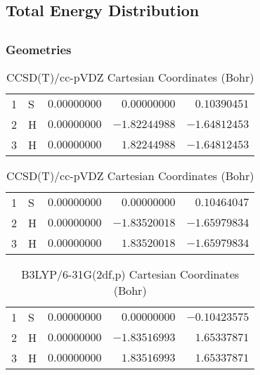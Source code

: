 \documentclass[10pt,oneside]{article}
\begin{document}
\begin{table}
\subsection*{Total Energy Distribution}
\centering\end{table}

\clearpage

\subsection{}

\begin{table}[h!]
\subsubsection*{Geometries}
\begin{multicols}{2}
\centering
\caption{CCSD(T)/cc-pVTZ Cartesian Coordinates (Bohr)}
\begin{tabular}{llrrr}
\toprule
1  & S  & $ 0.00000000$ & $ 0.00000000$ & $ 0.10390451$ \\
2  & H  & $ 0.00000000$ & $-1.82244988$ & $-1.64812453$ \\
3  & H  & $ 0.00000000$ & $ 1.82244988$ & $-1.64812453$ \\
\bottomrule
\end{tabular}
\caption{CCSD(T)/cc-pVDZ Cartesian Coordinates (Bohr)}
\begin{tabular}{llrrr}
\toprule
1  & S  & $ 0.00000000$ & $ 0.00000000$ & $ 0.10464047$ \\
2  & H  & $ 0.00000000$ & $-1.83520018$ & $-1.65979834$ \\
3  & H  & $ 0.00000000$ & $ 1.83520018$ & $-1.65979834$ \\
\bottomrule
\end{tabular}
\end{multicols}
\end{table}

\begin{table}[h]
\centering
\caption{B3LYP/6-31G(2df,p) Cartesian Coordinates (Bohr)}
\begin{tabular}{llrrr}
\toprule
1  & S  & $ 0.00000000$ & $ 0.00000000$ & $-0.10423575$ \\
2  & H  & $ 0.00000000$ & $-1.83516993$ & $ 1.65337871$ \\
3  & H  & $ 0.00000000$ & $ 1.83516993$ & $ 1.65337871$ \\
\bottomrule
\end{tabular}
\end{table}
\end{document}
